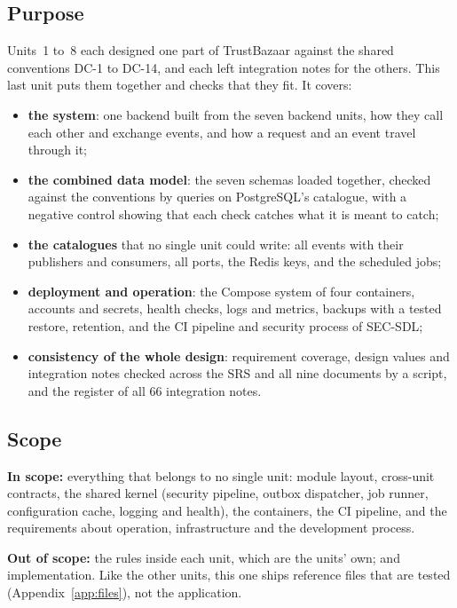 \documentclass[11pt,a4paper]{article}
\begin{document}
\subsection{Purpose}
Units~1 to~8 each designed one part of TrustBazaar against the shared conventions DC-1 to DC-14, and each left integration notes for the others. This last unit puts them together and checks that they fit. It covers:
\begin{itemize}[nosep]
  \item \textbf{the system}: one backend built from the seven backend units, how they call each other and exchange events, and how a request and an event travel through it;
  \item \textbf{the combined data model}: the seven schemas loaded together, checked against the conventions by queries on PostgreSQL's catalogue, with a negative control showing that each check catches what it is meant to catch;
  \item \textbf{the catalogues} that no single unit could write: all events with their publishers and consumers, all ports, the Redis keys, and the scheduled jobs;
  \item \textbf{deployment and operation}: the Compose system of four containers, accounts and secrets, health checks, logs and metrics, backups with a tested restore, retention, and the CI pipeline and security process of SEC-SDL;
  \item \textbf{consistency of the whole design}: requirement coverage, design values and integration notes checked across the SRS and all nine documents by a script, and the register of all 66 integration notes.
\end{itemize}

\subsection{Scope}
\textbf{In scope:} everything that belongs to no single unit: module layout, cross-unit contracts, the shared kernel (security pipeline, outbox dispatcher, job runner, configuration cache, logging and health), the containers, the CI pipeline, and the requirements about operation, infrastructure and the development process.

\textbf{Out of scope:} the rules inside each unit, which are the units' own; and implementation. Like the other units, this one ships reference files that are tested (Appendix~\ref{app:files}), not the application.
\end{document}
